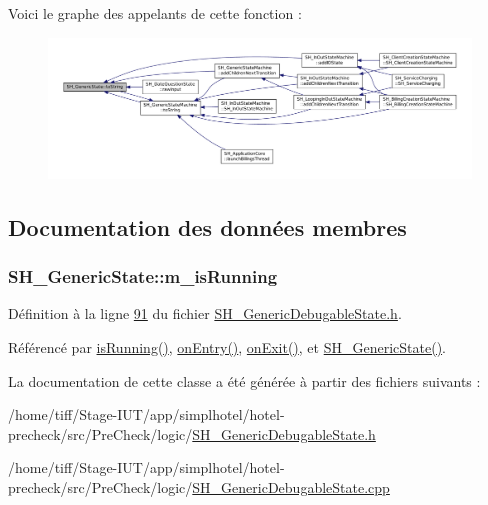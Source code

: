 Voici le graphe des appelants de cette fonction \-:\nopagebreak
\begin{figure}[H]
\begin{center}
\leavevmode
\includegraphics[width=350pt]{classSH__GenericState_a7779babbb40f3f8faa71112204d9804f_icgraph}
\end{center}
\end{figure}




\subsection{Documentation des données membres}
\hypertarget{classSH__GenericState_a72ddc905cfbffbed48bb2f2474d5297a}{
\subsubsection[{m\-\_\-is\-Running}]{\setlength{\rightskip}{0pt plus 5cm}S\-H\-\_\-\-Generic\-State\-::m\-\_\-is\-Running\hspace{0.3cm}{\ttfamily [private]}}}\label{classSH__GenericState_a72ddc905cfbffbed48bb2f2474d5297a}


Définition à la ligne \hyperlink{SH__GenericDebugableState_8h_source_l00091}{91} du fichier \hyperlink{SH__GenericDebugableState_8h_source}{S\-H\-\_\-\-Generic\-Debugable\-State.\-h}.



Référencé par \hyperlink{classSH__GenericState_a5f731810dad0cacd28828ccbf1539e4e}{is\-Running()}, \hyperlink{classSH__GenericState_a68c67ef95738e01cd34cd5926f4932fb}{on\-Entry()}, \hyperlink{classSH__GenericState_a7f7863859318c70c9b734be5bf5510b0}{on\-Exit()}, et \hyperlink{classSH__GenericState_a3cc3cb1491b812dfdd032fc6438dfd4e}{S\-H\-\_\-\-Generic\-State()}.



La documentation de cette classe a été générée à partir des fichiers suivants \-:\begin{DoxyCompactItemize}
\item 
/home/tiff/\-Stage-\/\-I\-U\-T/app/simplhotel/hotel-\/precheck/src/\-Pre\-Check/logic/\hyperlink{SH__GenericDebugableState_8h}{S\-H\-\_\-\-Generic\-Debugable\-State.\-h}\item 
/home/tiff/\-Stage-\/\-I\-U\-T/app/simplhotel/hotel-\/precheck/src/\-Pre\-Check/logic/\hyperlink{SH__GenericDebugableState_8cpp}{S\-H\-\_\-\-Generic\-Debugable\-State.\-cpp}\end{DoxyCompactItemize}
